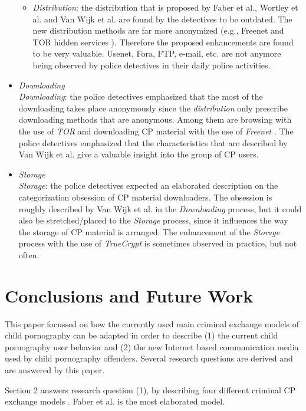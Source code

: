 \documentclass{sig-alternate-br}
\begin{document}
\begin{itemize}
\begin{itemize}
			\item \textit{Distribution}: the distribution that is proposed by Faber et al., Wortley et al. and Van Wijk et al. \cite{en2011phishing, wortley2006child, wijk2009achter} are found by the detectives to be outdated. The new distribution methods are far more anonymized (e.g., Freenet \cite{clarke2001freenet} and TOR hidden services \cite{dingledine2004tor}). Therefore the proposed enhancements are found to be very valuable. Usenet, Fora, FTP, e-mail, etc. are not anymore being observed by police detectives in their daily police activities.
		\end{itemize}
	\item \textit{Downloading}\\
		\textit{Downloading}: the police detectives emphasized that the most of the downloading takes place anonymously since the \textit{distribution} only prescribe downloading methods that are anonymous. Among them are browsing with the use of \textit{TOR} \cite{dingledine2004tor} and downloading CP material with the use of \textit{Freenet} \cite{clarke2001freenet}. The police detectives emphasized that the characteristics that are described by Van Wijk et al. \cite{wijk2009achter} give a valuable insight into the group of CP users.
	\item \textit{Storage}\\
		\textit{Storage}: the police detectives expected an elaborated description on the categorization obsession of CP material downloaders. The obsession is roughly described by Van Wijk et al. \cite{wijk2009achter} in the \textit{Downloading} process, but it could also be stretched/placed to the \textit{Storage} process, since it influences the way the storage of CP material is arranged. The enhancement of the \textit{Storage} process with the use of \textit{TrueCrypt} is sometimes observed in practice, but not often.
\end{itemize}


\section{Conclusions and Future Work}
This paper focussed on how the currently used main criminal exchange models of child pornography can be adapted in order to describe (1) the current child pornography user behavior and (2) the new Internet based communication media used by child pornography offenders. Several research questions are derived and are answered by this paper.

Section 2 answers research question (1), by describing four different criminal CP exchange models \cite{en2011phishing, wortley2006child, wijk2009achter, callanan2009internet}. Faber et al. \cite{en2011phishing} is the most elaborated model.
\end{document}
